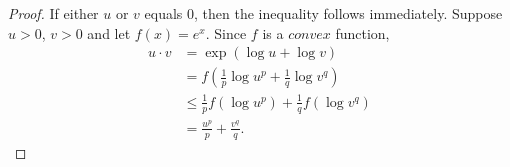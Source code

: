 \begin{proof}
    If either $u$ or $v$ equals $0$, then the inequality
    follows immediately. Suppose $u>0$, $v>0$ and let
    $f(x) = e^x$. Since $f$ is a $convex$ function,
    \begin{align*}
        u\cdot v &= \exp\left({\log{u}+\log{v}}\right)\\
        &= f\left(\frac{1}{p}\log{u^p} +\frac{1}{q}
        \log{v^q}\right)\\
        &\leq \frac{1}{p}f(\log{u^p})+\frac{1}{q}f(\log{v^q})\\
        &= \frac{u^p}{p}+\frac{v^q}{q}.
    \end{align*}
\end{proof}
